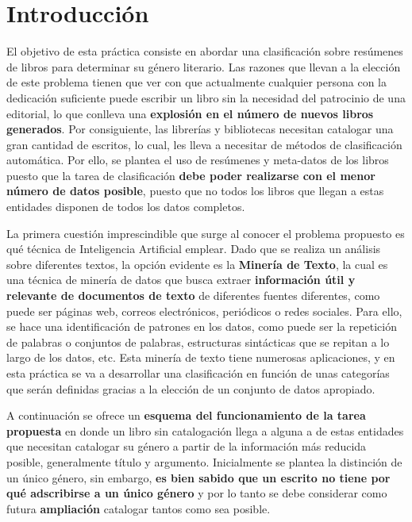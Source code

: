 \documentclass[12pt,a4paper, xcolor=table]{article}
\begin{document}
\section{Introducción}

El objetivo de esta práctica consiste en abordar una clasificación sobre resúmenes de libros para determinar su género literario. Las razones que llevan a la elección de este problema tienen que ver con que actualmente cualquier persona con la dedicación suficiente puede escribir un libro sin la necesidad del patrocinio de una editorial, lo que conlleva una \textbf{explosión en el número de nuevos libros generados}. Por consiguiente, las librerías y bibliotecas necesitan catalogar una gran cantidad de escritos, lo cual, les lleva a necesitar de métodos de clasificación automática. Por ello, se plantea el uso de resúmenes y meta-datos de los libros puesto que la tarea de clasificación \textbf{debe poder realizarse con el menor número de datos posible}, puesto que no todos los libros que llegan a estas entidades disponen de todos los datos completos.

\vspace{3mm}

La primera cuestión imprescindible que surge al conocer el problema propuesto es qué técnica de Inteligencia Artificial emplear. Dado que se realiza un análisis sobre diferentes textos, la opción evidente es la \textbf{Minería de Texto}, la cual es una técnica de minería de datos que busca extraer \textbf{información útil y relevante de documentos de texto} de diferentes fuentes diferentes, como puede ser páginas web,
correos electrónicos, periódicos o redes sociales. Para ello, se hace una identificación de patrones en los datos, como puede ser la repetición de palabras o conjuntos de palabras, estructuras sintácticas que se repitan a lo largo de los datos, etc. Esta minería de texto tiene numerosas aplicaciones, y en esta práctica se va a desarrollar una clasificación en función de unas categorías que serán definidas gracias a la elección de un conjunto de datos apropiado.

\vspace{3mm}

A continuación se ofrece un \textbf{esquema del funcionamiento de la tarea propuesta} en donde un libro sin catalogación llega a alguna a de estas entidades que necesitan catalogar su género a partir de la información más reducida posible, generalmente título y argumento. Inicialmente se plantea la distinción de un único género, sin embargo, \textbf{es bien sabido que un escrito no tiene por qué adscribirse a un único género} y por lo tanto se debe considerar como futura \textbf{ampliación} catalogar tantos como sea posible.
\end{document}

